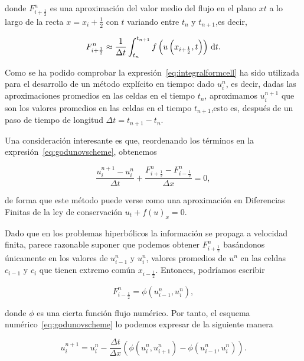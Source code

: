 donde $F^{n}_{i+\frac{1}{2}}$ es una aproximación del valor medio del
flujo en el plano $xt$ a lo largo de la recta $x=x_{i}+\frac{1}{2}$
con $t$ variando entre $t_{n}$ y $t_{n+1}$,es decir,

\begin{equation}\label{eq:numericalflux}
  F^{n}_{i+\frac{1}{2}}\approx
  \frac{1}{\Delta t}
  \int_{t_{n}}^{t_{n+1}}
  f
  \left(
  u
  \left(x_{i+\frac{1}{2}},t\right)
  \right)
  \dl t.
\end{equation}

Como se ha podido comprobar la expresión~\eqref{eq:integralformcell}
ha sido utilizada para el desarrollo de un método explícito en
tiempo: dado $u^{n}_{i}$, es decir, dadas las aproximaciones
promedios en las celdas en el tiempo $t_{n}$, aproximamos
$u^{n+1}_{i}$ que son los valores promedios en las celdas en el
tiempo $t_{n+1}$,esto es, después de un paso de tiempo de longitud
$\Delta t=t_{n+1}-t_{n}$.

Una consideración interesante es que, reordenando los términos en la
expresión~\eqref{eq:godunovscheme}, obtenemos

\begin{equation*}
  \frac{u^{n+1}_{i}-u^{n}_{i}}{\Delta t}+
  \frac{F^{n}_{i+\frac{1}{2}}-F^{n}_{i-\frac{1}{2}}}{\Delta x}=
  0,
\end{equation*}

de forma que este método puede verse como una aproximación en
Diferencias Finitas de la ley de conservación
$u_{t}+f\left(u\right)_{x}=0$.

Dado que en los problemas hiperbólicos la información se propaga a
velocidad finita, parece razonable suponer que podemos obtener
$F^{n}_{i+\frac{1}{2}}$ basándonos únicamente en los valores de
$u^{n}_{i-1}$ y $u^{n}_{i}$, valores promedios de $u^{n}$ en las
celdas $c_{i-1}$ y $c_{i}$ que tienen extremo común
$x_{i-\frac{1}{2}}$.
Entonces, podríamos escribir

\begin{equation*}
  F^{n}_{i-\frac{1}{2}}=
  \phi
  \left(
  u^{n}_{i-1},
  u^{n}_{i}
  \right),
\end{equation*}

donde $\phi$ es una cierta función flujo numérico.
Por tanto, el esquema numérico~\eqref{eq:godunovscheme} lo podemos
expresar de la siguiente manera

\begin{equation}\label{eq:onestepscheme}
  u^{n+1}_{i}=
  u^{n}_{i}-
  \frac{\Delta t}{\Delta x}
  \left(
  \phi\left(u^{n}_{i},u^{n}_{i+1}\right)-
  \phi\left(u^{n}_{i-1},u^{n}_{i}\right)
  \right).
\end{equation}

